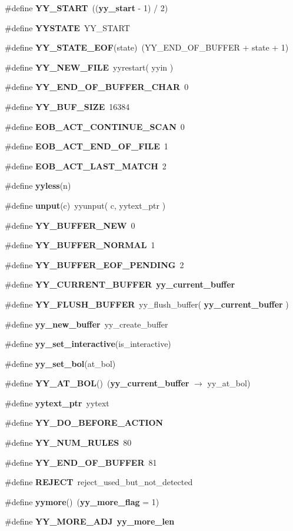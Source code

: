 \begin{CompactItemize}
\#define {\bf YY\_\-START}\ (({\bf yy\_\-start} - 1) / 2)
\item 
\#define {\bf YYSTATE}\ YY\_\-START
\item 
\#define {\bf YY\_\-STATE\_\-EOF}(state)\ (YY\_\-END\_\-OF\_\-BUFFER + state + 1)
\item 
\#define {\bf YY\_\-NEW\_\-FILE}\ yyrestart( yyin )
\item 
\#define {\bf YY\_\-END\_\-OF\_\-BUFFER\_\-CHAR}\ 0
\item 
\#define {\bf YY\_\-BUF\_\-SIZE}\ 16384
\item 
\#define {\bf EOB\_\-ACT\_\-CONTINUE\_\-SCAN}\ 0
\item 
\#define {\bf EOB\_\-ACT\_\-END\_\-OF\_\-FILE}\ 1
\item 
\#define {\bf EOB\_\-ACT\_\-LAST\_\-MATCH}\ 2
\item 
\#define {\bf yyless}(n)
\item 
\#define {\bf unput}(c)\ yyunput( c, yytext\_\-ptr )
\item 
\#define {\bf YY\_\-BUFFER\_\-NEW}\ 0
\item 
\#define {\bf YY\_\-BUFFER\_\-NORMAL}\ 1
\item 
\#define {\bf YY\_\-BUFFER\_\-EOF\_\-PENDING}\ 2
\item 
\#define {\bf YY\_\-CURRENT\_\-BUFFER}\ {\bf yy\_\-current\_\-buffer}
\item 
\#define {\bf YY\_\-FLUSH\_\-BUFFER}\ yy\_\-flush\_\-buffer( {\bf yy\_\-current\_\-buffer} )
\item 
\#define {\bf yy\_\-new\_\-buffer}\ yy\_\-create\_\-buffer
\item 
\#define {\bf yy\_\-set\_\-interactive}(is\_\-interactive)
\item 
\#define {\bf yy\_\-set\_\-bol}(at\_\-bol)
\item 
\#define {\bf YY\_\-AT\_\-BOL}()\ ({\bf yy\_\-current\_\-buffer} $\rightarrow$ yy\_\-at\_\-bol)
\item 
\#define {\bf yytext\_\-ptr}\ yytext
\item 
\#define {\bf YY\_\-DO\_\-BEFORE\_\-ACTION}
\item 
\#define {\bf YY\_\-NUM\_\-RULES}\ 80
\item 
\#define {\bf YY\_\-END\_\-OF\_\-BUFFER}\ 81
\item 
\#define {\bf REJECT}\ reject\_\-used\_\-but\_\-not\_\-detected
\item 
\#define {\bf yymore}()\ ({\bf yy\_\-more\_\-flag} = 1)
\item 
\#define {\bf YY\_\-MORE\_\-ADJ}\ {\bf yy\_\-more\_\-len}

\end{CompactItemize}
